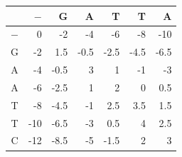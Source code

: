 \begin{tabular}{crrrrrr}\toprule
 & $-$ & G & A & T & T & A\\\midrule
$-$ & 0 & -2 & -4 & -6 & -8 & -10\\
G & -2 & 1.5 & -0.5 & -2.5 & -4.5 & -6.5\\
A & -4 & -0.5 & 3 & 1 & -1 & -3\\
A & -6 & -2.5 & 1 & 2 & 0 & 0.5\\
T & -8 & -4.5 & -1 & 2.5 & 3.5 & 1.5\\
T & -10 & -6.5 & -3 & 0.5 & 4 & 2.5\\
C & -12 & -8.5 & -5 & -1.5 & 2 & 3\\
\bottomrule\end{tabular}
